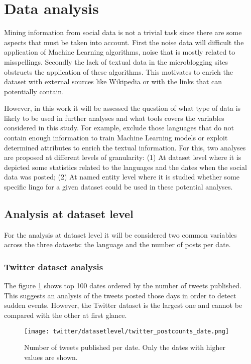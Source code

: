 \section{Data analysis}

Mining information from social data is not a trivial task since there are some aspects that must be taken into account. First the noise data will difficult the application of Machine Learning algorithms, noise that is mostly related to misspellings. Secondly the lack of textual data in the microblogging sites obstructs the application of these algorithms. This motivates to enrich the dataset with external sources like Wikipedia \citep{paper:wikiEnrich} or with the links that can potentially contain.
\par However, in this work it will be assessed the question of what type of data is likely to be used in further analyses and what tools covers the variables considered in this study. For example, exclude those languages that do not contain enough information to train Machine Learning models or exploit determined attributes to enrich the textual information. For this, two analyses are proposed at different levels of granularity: (1) At dataset level where it is depicted some statistics related to the languages and the dates when the social data was posted; (2) At named entity level where it is studied whether some specific lingo for a given dataset could be used in these potential analyses.


\subsection{Analysis at dataset level}
For the analysis at dataset level it will be considered two common variables across the three datasets: the language and the number of posts per date.
\subsubsection{Twitter dataset analysis}
The figure \ref{fig:twitter_postcounts_date} shows top 100 dates ordered by the number of tweets published. This suggests an analysis of the tweets posted those days in order to detect sudden events.
However, the Twitter dataset is the largest one and cannot be compared with the other at first glance.
\begin{figure}[H]
	\begin{center}
		\texttt{[image: twitter/datasetlevel/twitter\_postcounts\_date.png]}
		\caption{Number of tweets published per date. Only the dates with higher values are shown.}
		\label{fig:twitter_postcounts_date}
	\end{center}
\end{figure}

